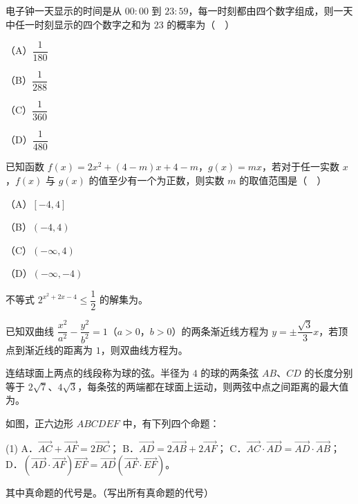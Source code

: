 \begin{question}
电子钟一天显示的时间是从 $00\!:\!00$ 到 $23\!:\!59$，每一时刻都由四个数字组成，则一天中任一时刻显示的四个数字之和为 $23$ 的概率为（　）

（A）$\dfrac1{180}$

（B）$\dfrac1{288}$

（C）$\dfrac1{360}$

（D）$\dfrac1{480}$

\end{question}
\begin{question}
已知函数 $f(x)=2x^2+(4-m)x+4-m$，$g(x)=mx$，若对于任一实数 $x$，$f(x)$ 与 $g(x)$ 的值至少有一个为正数，则实数 $m$ 的取值范围是（　）

（A）$[-4,4]$

（B）$(-4,4)$

（C）$(-\infty,4)$

（D）$(-\infty,-4)$

\end{question}

\begin{question}
不等式 $2^{x^2+2x-4}\leqslant\dfrac12$ 的解集为\gkblank{}。

\end{question}
\begin{question}
已知双曲线 $\dfrac{x^2}{a^2}-\dfrac{y^2}{b^2}=1$（$a>0$，$b>0$）的两条渐近线方程为 $y=\pm\dfrac{\sqrt3}3x$，若顶点到渐近线的距离为 $1$，则双曲线方程为\gkblank{}。

\end{question}
\begin{question}
连结球面上两点的线段称为球的弦。半径为 $4$ 的球的两条弦 $AB$、$CD$ 的长度分别等于 $2\sqrt7$、$4\sqrt3$，每条弦的两端都在球面上运动，则两弦中点之间距离的最大值为\gkblank{}。

\Needspace{0.4\textheight}
\end{question}
\begin{question}
如图，正六边形 $ABCDEF$ 中，有下列四个命题：

\begin{gkopts}(1)
\task A．$\overrightarrow{AC}+\overrightarrow{AF}=2\overrightarrow{BC}$；
\task B．$\overrightarrow{AD}=2\overrightarrow{AB}+2\overrightarrow{AF}$；
\task C．$\overrightarrow{AC}\cdot\overrightarrow{AD}=\overrightarrow{AD}\cdot\overrightarrow{AB}$；
\task D．$(\overrightarrow{AD}\cdot\overrightarrow{AF})\overrightarrow{EF}=\overrightarrow{AD}(\overrightarrow{AF}\cdot\overrightarrow{EF})$。
\end{gkopts}

其中真命题的代号是\gkblank{}。（写出所有真命题的代号）
\nopagebreak[4]
\begin{center}\end{center}
\nopagebreak[4]
\end{question}

